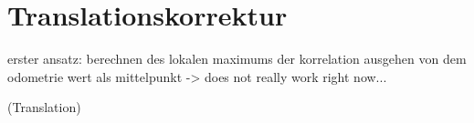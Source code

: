 \section{Translationskorrektur}

erster ansatz: berechnen des lokalen maximums der korrelation ausgehen von dem odometrie wert als mittelpunkt -> does not really work right now...

(Translation)